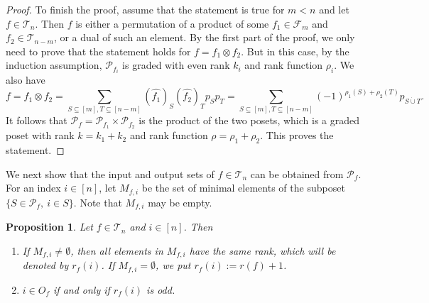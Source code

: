 \documentclass[12pt]{article}
\newtheorem{prop}{Proposition}
\theoremstyle{definition}
\theoremstyle{remark}
\def\Te{\mathcal T}
\def\Fe{\mathcal F}
\def\Pe{\mathcal P}
\begin{document}
\begin{proof}
To finish the proof, assume that the statement is true for $m<n$ and let $f\in \Te_n$.
Then $f$ is either a permutation of a product of some $f_1\in \Fe_{m}$ and $f_2\in \Te_{n-m}$, or a
dual  of such an element. By the first part of the proof,  we only need to prove
that the statement holds for $f=f_1\otimes f_2$. But in this case, by the induction
assumption, $\Pe_{f_i}$ is graded with even rank $k_i$ and rank function $\rho_i$. We also
have
\[
f=f_1\otimes f_2=\sum_{S\subseteq [m], T\subseteq [n-m]} (\widehat {f_1})_S(\widehat {f_2})_T p_Sp_T=
\sum_{S\subseteq [m], T\subseteq [n-m]}(-1)^{\rho_1(S)+\rho_2(T)}p_{S\dot{\cup}T}.
\]
It follows that $\Pe_f=\Pe_{f_1}\times \Pe_{f_2}$ is the product of the two posets, which
is a graded poset with rank $k=k_1+k_2$ and rank function $\rho=\rho_1+\rho_2$. This
proves the statement. 

\end{proof}


We next show that the input and output sets of $f\in \Te_n$ can be obtained from $\Pe_f$. For an
index $i\in [n]$, let  $M_{f,i}$ be the set of minimal elements of the subposet $\{S\in \Pe_f,\ i\in S\}$.
Note that $M_{f,i}$ may be empty.

\begin{prop}\label{prop:pfinput} Let $f\in \Te_n$ and $i\in [n]$. Then
\begin{enumerate}
\item If $M_{f,i}\ne
\emptyset$, then all elements in $M_{f,i}$  have the same rank,  which will be
denoted by $r_f(i)$. If $M_{f,i}=\emptyset$, we put $r_f(i):=r(f)+1$. 
\item $i\in O_f$ if and only if $r_f(i)$ is odd.

\end{enumerate}
\end{prop}
\end{document}
